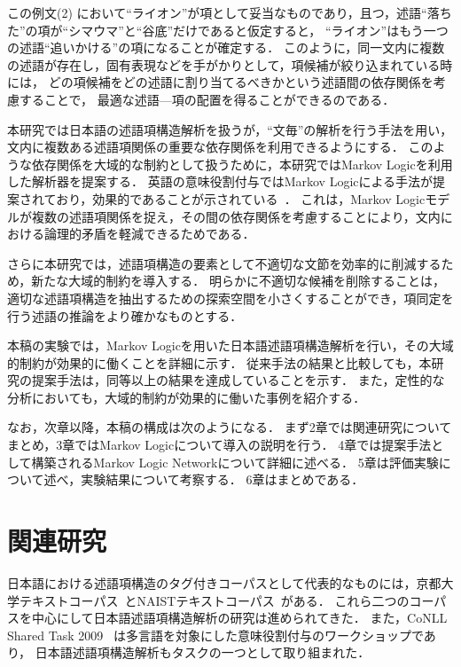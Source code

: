 \documentclass[japanese]{jnlp_1.4}
\begin{document}
この例文(2) において``ライオン''が項として妥当なものであり，且つ，述語``落ちた''の項が``シマウマ''と``谷底''だけであると仮定すると，
``ライオン''はもう一つの述語``追いかける''の項になることが確定する．
このように，同一文内に複数の述語が存在し，固有表現などを手がかりとして，項候補が絞り込まれている時には，
どの項候補をどの述語に割り当てるべきかという述語間の依存関係を考慮することで，
最適な述語—項の配置を得ることができるのである．

本研究では日本語の述語項構造解析を扱うが，``文毎''の解析を行う手法を用い，文内に複数ある述語項関係の重要な依存関係を利用できるようにする．
このような依存関係を大域的な制約として扱うために，本研究ではMarkov Logicを利用した解析器を提案する．
英語の意味役割付与ではMarkov Logicによる手法が提案されており，効果的であることが示されている~\cite{meza:2009:naacl}．
これは，Markov Logicモデルが複数の述語項関係を捉え，その間の依存関係を考慮することにより，文内における論理的矛盾を軽減できるためである．

さらに本研究では，述語項構造の要素として不適切な文節を効率的に削減するため，新たな大域的制約を導入する．
明らかに不適切な候補を削除することは，適切な述語項構造を抽出するための探索空間を小さくすることができ，項同定を行う述語の推論をより確かなものとする．

本稿の実験では，Markov Logicを用いた日本語述語項構造解析を行い，その大域的制約が効果的に働くことを詳細に示す．
従来手法の結果と比較しても，本研究の提案手法は，同等以上の結果を達成していることを示す．
また，定性的な分析においても，大域的制約が効果的に働いた事例を紹介する．

なお，次章以降，本稿の構成は次のようになる．
まず2章では関連研究についてまとめ，3章ではMarkov Logicについて導入の説明を行う．
4章では提案手法として構築されるMarkov Logic Networkについて詳細に述べる．
5章は評価実験について述べ，実験結果について考察する．
6章はまとめである．



\section{関連研究}\label{related}

日本語における述語項構造のタグ付きコーパスとして代表的なものには，京都大学テキストコーパス~\cite{kawahara:2002:jnlp}とNAISTテキストコーパス~\cite{iida:2007:law}がある．
これら二つのコーパスを中心にして日本語述語項構造解析の研究は進められてきた．
また，CoNLL Shared Task 2009~\cite{hajivc:2009:conll} は多言語を対象にした意味役割付与のワークショップであり，
日本語述語項構造解析もタスクの一つとして取り組まれた．
\end{document}
